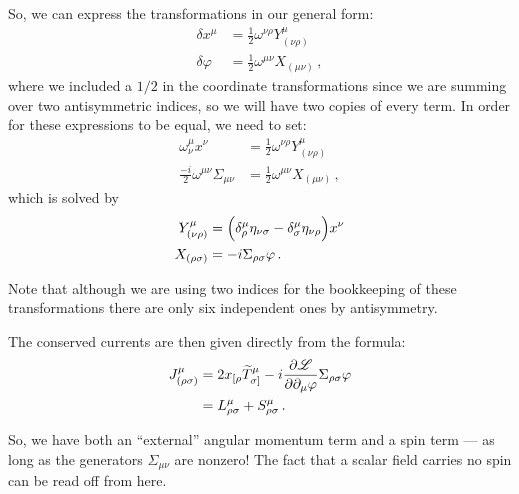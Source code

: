 \documentclass[main.tex]{subfiles}
\begin{document}
So, we can express the transformations in our general form:
%
\begin{align}
\delta x^{\mu } &= \frac{1}{2} \omega^{\nu \rho } Y^{\mu }_{(\nu \rho )}  \\
\delta \varphi  &= \frac{1}{2} \omega^{\mu \nu } X_{(\mu \nu )}
\,,
\end{align}
%
where we included a \(1/2\) in the coordinate transformations since we are summing over two antisymmetric indices, so we will have two copies of every term. In order for these expressions to be equal, we need to set: 
%
\begin{align}
\omega^{\mu }_{\nu }x^{\nu } &= \frac{1}{2} \omega^{\nu \rho } Y^{\mu }_{(\nu \rho )}  \\
\frac{-i}{2} \omega^{\mu \nu } \Sigma_{\mu \nu } &=\frac{1}{2} \omega^{\mu \nu } X_{(\mu \nu )}
\,,
\end{align}
%
which is solved by 
%
\begin{align}
Y^{\mu }_{(\nu \rho )} &= \qty(\delta ^{\mu }_{\rho } \eta_{\nu \sigma } - \delta ^{\mu }_{\sigma } \eta_{\nu \rho })x^{\nu }  \\
X_{(\rho \sigma )} &= -i \Sigma_{\rho \sigma }
\varphi 
\,.
\end{align}

Note that although we are using two indices for the bookkeeping of these transformations there are only six independent ones by antisymmetry. 

The conserved currents are then given directly from the formula: 
%
\begin{align}
J^{\mu }_{(\rho \sigma )} &= 2 x_{[\rho } \widetilde{T}_{\sigma ]}^{\mu } - i \pdv{\mathscr{L}}{\partial_{\mu }\varphi } \Sigma_{\rho \sigma } \varphi  \\
&= L^{\mu }_{\rho \sigma } + S^{\mu }_{\rho \sigma }
\,.
\end{align}


So, we have both an ``external'' angular momentum term and a spin term --- as long as the generators \(\Sigma_{\mu  \nu }\) are nonzero! The fact that a scalar field carries no spin can be read off from here. 
\end{document}
